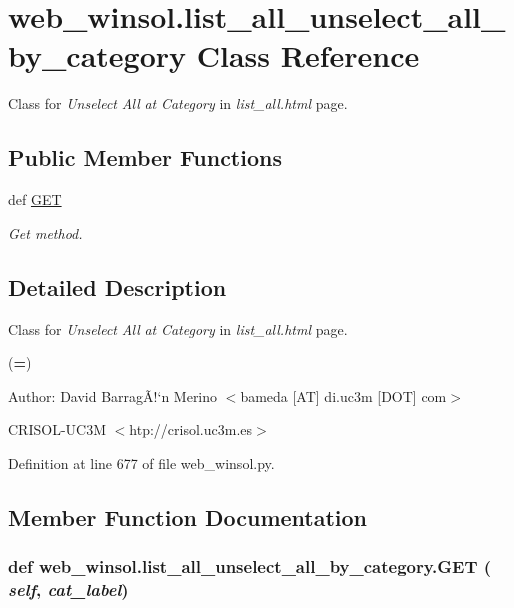 \hypertarget{classweb__winsol_1_1list__all__unselect__all__by__category}{
\section{web\_\-winsol.list\_\-all\_\-unselect\_\-all\_\-by\_\-category Class Reference}
\label{classweb__winsol_1_1list__all__unselect__all__by__category}
}
Class for {\em Unselect\/} {\em All\/} {\em at\/} {\em Category\/} in {\em list\_\-all.html\/} page.  


\subsection*{Public Member Functions}
\begin{CompactItemize}
\item 
def \hyperlink{classweb__winsol_1_1list__all__unselect__all__by__category_f2691ce4a1e06e5474fdfd398851c4bd}{GET}
\begin{CompactList}\small\item\em Get method. \item\end{CompactList}\end{CompactItemize}


\subsection{Detailed Description}
Class for {\em Unselect\/} {\em All\/} {\em at\/} {\em Category\/} in {\em list\_\-all.html\/} page. 

({\bf =})

\begin{Desc}
\item[Author:]David Barrag\~{A}!`n Merino $<$bameda \mbox{[}AT\mbox{]} di.uc3m \mbox{[}DOT\mbox{]} com$>$ 

CRISOL-UC3M $<$htp://crisol.uc3m.es$>$ \end{Desc}




Definition at line 677 of file web\_\-winsol.py.

\subsection{Member Function Documentation}
\hypertarget{classweb__winsol_1_1list__all__unselect__all__by__category_f2691ce4a1e06e5474fdfd398851c4bd}{
\subsubsection[GET]{\setlength{\rightskip}{0pt plus 5cm}def web\_\-winsol.list\_\-all\_\-unselect\_\-all\_\-by\_\-category.GET ( {\em self},  {\em cat\_\-label})}}
\label{classweb__winsol_1_1list__all__unselect__all__by__category_f2691ce4a1e06e5474fdfd398851c4bd}


